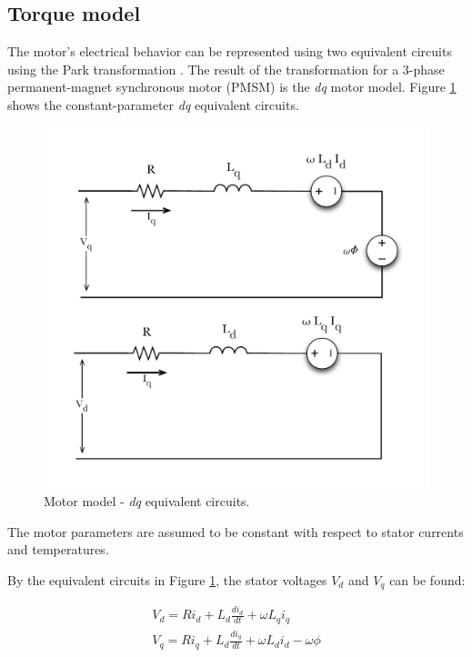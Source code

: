 \documentclass[../SimBALink.tex]{subfiles}
\begin{document}
	\subsection{Torque model}
		The motor's electrical behavior can be represented using two equivalent circuits using the Park transformation \cite{Park1929}. The result of the transformation for a 3-phase permanent-magnet synchronous motor (PMSM) is the \textit{dq} motor model. Figure \ref{fig:Motor_equivalent_circuit} shows the constant-parameter \textit{dq} equivalent circuits.
		
		\begin{figure}[h]
			\centering
			\includegraphics[width=\linewidth]{../Model/Powertrain/Motor/Documentation/Figures/Motor_equivalent_circuit}
			\caption{Motor model - \textit{dq} equivalent circuits.}
			\label{fig:Motor_equivalent_circuit}
		\end{figure}
		\FloatBarrier
		
		The motor parameters are assumed to be constant with respect to stator currents and temperatures.
		
		By the equivalent circuits in Figure \ref{fig:Motor_equivalent_circuit}, the stator voltages $V_d$ and $V_q$ can be found:
		
		\begin{gather}
			V_d		= R i_d + L_d \frac{ d i_d }{ d t } + \omega L_q i_q				\label{eqn:Vd_with_Vl}\\
			V_q		= R i_q + L_d \frac{ d i_q }{ d t } + \omega L_d i_d	- \omega \phi	\label{eqn:Vq_with_Vl}
		\end{gather}
		
\end{document}
